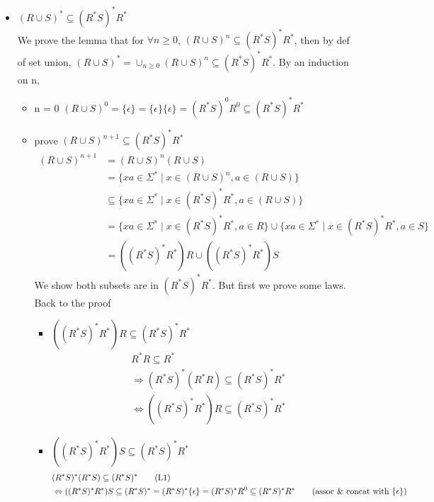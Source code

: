 \documentclass[12pt]{article}
\begin{document}
\begin{itemize}
  \item \((R \cup S)^* \subseteq (R^*S)^*R^*\)\\
  We prove the lemma that for \(\forall n \geq 0\), \((R \cup S)^n \subseteq (R^*S)^*R^*\), then by def of set union, \((R \cup S)^* = \cup_{n \geq 0}(R \cup S)^n \subseteq (R^*S)^*R^*\). By an induction on n,
  \begin{itemize}
    \item n = 0 \((R \cup S)^0 = \{\epsilon\} = \{\epsilon\}\{\epsilon\} = (R^*S)^0R^0 \subseteq (R^*S)^*R^*\)
    \item prove \((R \cup S)^{n+1} \subseteq (R^*S)^*R^*\)
    \begin{align*}
      (R \cup S)^{n+1} &= (R \cup S)^{n} (R \cup S) \tag*{(concat of lang)}\\
      &= \{xa \in \Sigma^* \mid x \in (R \cup S)^{n}, a \in (R \cup S)\} \tag*{(set notation of concat)}\\
      &\subseteq \{xa \in \Sigma^* \mid x \in (R^*S)^*R^*, a \in (R \cup S)\} \tag*{(IH)}\\
      &= \{xa \in \Sigma^* \mid x \in (R^*S)^*R^*, a \in R\} \cup \{xa \in \Sigma^* \mid x \in (R^*S)^*R^*, a \in S\} \\
      &= ((R^*S)^*R^*)R \cup ((R^*S)^*R^*)S \tag*{(set def of concat)}
    \end{align*}
    We show both subsets are in \((R^*S)^*R^*\). But first we prove some laws.\\
    Back to the proof
    \begin{itemize}
      \item \(((R^*S)^*R^*)R \subseteq (R^*S)^*R^*\)
      \begin{align*}
        &R^*R \subseteq R^* \tag*{(L1)}\\
        &\Rightarrow (R^*S)^*(R^*R) \subseteq (R^*S)^*R^* \tag*{(L2)}\\
        &\Leftrightarrow ((R^*S)^*R^*)R \subseteq (R^*S)^*R^* \tag*{(associativity)}
      \end{align*}
      \item \(((R^*S)^*R^*)S \subseteq (R^*S)^*R^*\)
      \begin{align*}
        & (R^*S)^*(R^*S) \subseteq (R^*S)^* \tag*{(L1)}\\
        &\Leftrightarrow ((R^*S)^*R^*)S \subseteq (R^*S)^* = (R^*S)^*\{\epsilon\}
        = (R^*S)^*R^0 \subseteq (R^*S)^*R^*
        \tag*{(assoc \& concat with \(\{\epsilon\}\))}
      \end{align*}

\end{itemize}
\end{itemize}
\end{itemize}
\end{document}
